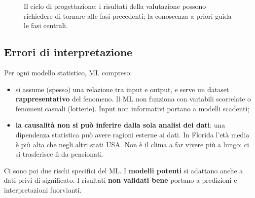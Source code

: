 \begin{figure}[ht]
\centering
{}
\caption{Il ciclo di progettazione: i risultati della valutazione possono richiedere di tornare alle fasi
precedenti; la conoscenza a priori guida le fasi centrali.}
\label{fig:ciclo}
\end{figure}

\subsection{Errori di interpretazione}

Per ogni modello statistico, ML compreso:
\begin{itemize}
  \item si assume (spesso) una relazione tra input e output, e serve un dataset \textbf{rappresentativo} del
        fenomeno. Il ML non funziona con variabili scorrelate o fenomeni casuali (lotterie). Input non
        informativi portano a modelli scadenti;
  \item \textbf{la causalità non si può inferire dalla sola analisi dei dati}: una dipendenza statistica può
        avere ragioni esterne ai dati. In Florida l'età media è più alta che negli altri stati USA. Non è il
        clima a far vivere più a lungo: ci si trasferisce lì da pensionati.
\end{itemize}
Ci sono poi due rischi specifici del ML. I \textbf{modelli potenti} si adattano anche a dati privi di significato.
I risultati \textbf{non validati bene} portano a predizioni e interpretazioni fuorvianti.

